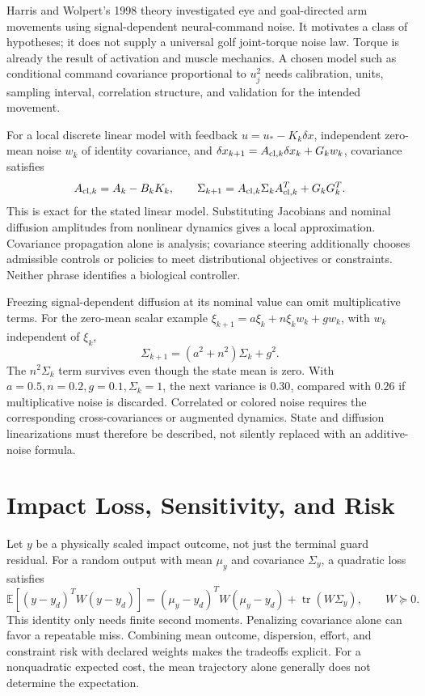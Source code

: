 Harris and Wolpert's 1998 theory investigated eye and goal-directed arm
movements using signal-dependent neural-command noise. It motivates a class
of hypotheses; it does not supply a universal golf joint-torque noise law.
Torque is already the result of activation and muscle mechanics. A chosen
model such as conditional command covariance proportional to $u_j^2$ needs
calibration, units, sampling interval, correlation structure, and validation
for the intended movement.

For a local discrete linear model with feedback
$u=u_*-K_k\delta x$, independent zero-mean noise $w_k$ of identity covariance,
and $\delta x_{k+1}=A_{{\rm cl},k}\delta x_k+G_kw_k$, covariance satisfies
\begin{equation}\label{eq:ocp_covariance}
 A_{{\rm cl},k}=A_k-B_kK_k,\qquad
 \Sigma_{k+1}=A_{{\rm cl},k}\Sigma_kA_{{\rm cl},k}^T+G_kG_k^T.
\end{equation}
This is exact for the stated linear model. Substituting Jacobians and nominal
diffusion amplitudes from nonlinear dynamics gives a local approximation.
Covariance propagation alone is analysis; covariance steering additionally
chooses admissible controls or policies to meet distributional objectives
or constraints. Neither phrase identifies a biological controller.

Freezing signal-dependent diffusion at its nominal value can omit
multiplicative terms. For the zero-mean scalar example
$\xi_{k+1}=a\xi_k+n\xi_kw_k+g w_k$, with $w_k$ independent of $\xi_k$,
\begin{equation}\label{eq:multiplicative_covariance}
 \Sigma_{k+1}=(a^2+n^2)\Sigma_k+g^2.
\end{equation}
The $n^2\Sigma_k$ term survives even though the state mean is zero. With
$a=0.5,n=0.2,g=0.1,\Sigma_k=1$, the next variance is $0.30$, compared with
$0.26$ if multiplicative noise is discarded. Correlated or colored noise
requires the corresponding cross-covariances or augmented dynamics. State
and diffusion linearizations must therefore be described, not silently
replaced with an additive-noise formula.

\section{Impact Loss, Sensitivity, and Risk}

Let $y$ be a physically scaled impact outcome, not just the terminal guard
residual. For a random output with mean $\mu_y$
and covariance $\Sigma_y$, a quadratic loss satisfies
\begin{equation}\label{eq:ocp_output_loss}
 \mathbb E[(y-y_d)^TW(y-y_d)]
 =(\mu_y-y_d)^TW(\mu_y-y_d)+\operatorname{tr}(W\Sigma_y),
 \qquad W\succeq0.
\end{equation}
This identity only needs finite second moments. Penalizing covariance alone
can favor a repeatable miss. Combining mean outcome, dispersion, effort, and
constraint risk with declared weights makes the tradeoffs explicit. For a
nonquadratic expected cost, the mean trajectory alone generally does not
determine the expectation.

